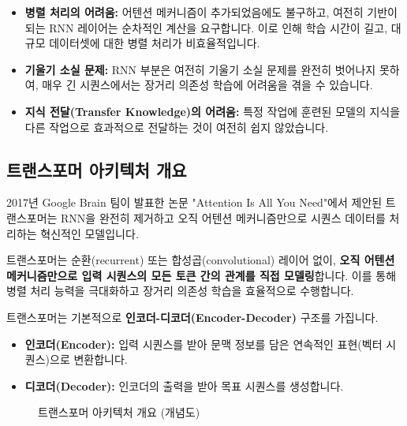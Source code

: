 \documentclass[11pt,a4paper]{article}
\theoremstyle{definition}
\begin{document}
\begin{tcolorbox}[warning, title={어텐션 기반 RNN의 한계점}]
\begin{itemize}
    \item \textbf{병렬 처리의 어려움:} 어텐션 메커니즘이 추가되었음에도 불구하고, 여전히 기반이 되는 RNN 레이어는 순차적인 계산을 요구합니다. 이로 인해 학습 시간이 길고, 대규모 데이터셋에 대한 병렬 처리가 비효율적입니다.
    \item \textbf{기울기 소실 문제:} RNN 부분은 여전히 기울기 소실 문제를 완전히 벗어나지 못하여, 매우 긴 시퀀스에서는 장거리 의존성 학습에 어려움을 겪을 수 있습니다.
    \item \textbf{지식 전달(Transfer Knowledge)의 어려움:} 특정 작업에 훈련된 모델의 지식을 다른 작업으로 효과적으로 전달하는 것이 여전히 쉽지 않았습니다.
\end{itemize}
\end{tcolorbox}

\subsection{트랜스포머 아키텍처 개요}
2017년 Google Brain 팀이 발표한 논문 "Attention Is All You Need"에서 제안된 트랜스포머는 RNN을 완전히 제거하고 오직 어텐션 메커니즘만으로 시퀀스 데이터를 처리하는 혁신적인 모델입니다.

\begin{tcolorbox}[mybox, title={트랜스포머의 핵심 철학: "Attention Is All You Need"}]
트랜스포머는 순환(recurrent) 또는 합성곱(convolutional) 레이어 없이, \textbf{오직 어텐션 메커니즘만으로 입력 시퀀스의 모든 토큰 간의 관계를 직접 모델링}합니다. 이를 통해 병렬 처리 능력을 극대화하고 장거리 의존성 학습을 효율적으로 수행합니다.
\end{tcolorbox}

트랜스포머는 기본적으로 \textbf{인코더-디코더(Encoder-Decoder)} 구조를 가집니다.

\begin{itemize}
    \item \textbf{인코더(Encoder):} 입력 시퀀스를 받아 문맥 정보를 담은 연속적인 표현(벡터 시퀀스)으로 변환합니다.
    \item \textbf{디코더(Decoder):} 인코더의 출력을 받아 목표 시퀀스를 생성합니다.
\end{itemize}

\begin{figure}[h!]
    \centering
    \caption{트랜스포머 아키텍처 개요 (개념도)}
    \label{fig:transformer_architecture}
\end{figure}
\end{document}
